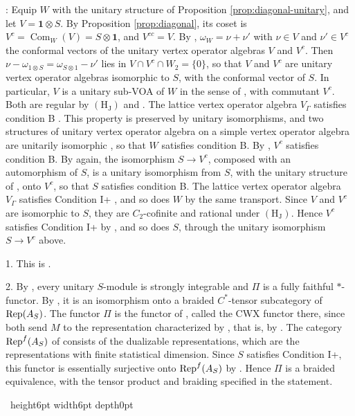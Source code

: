 \documentclass[leqno]{article}
\let\cal\relax
\newcommand{\cal}{\mathcal}
\newcommand{\qed}{\hfill \vrule height6pt  width6pt depth0pt}
\newcommand{\ot}{\otimes}
\DeclareMathOperator{\Rep}{Rep} %
\newenvironment{proof}[1][]{\noindent {\it Proof #1} : }{\hbox{~}\qed
\smallskip
}
\numberwithin{equation}{section}
\begin{document}
\begin{proof}
Equip $W$ with the unitary structure of Proposition \ref{prop:diagonal-unitary}, and let $V = \mathbf 1 \ot S$. By Proposition \ref{prop:diagonal}, its coset is $V^c = \operatorname{Com}_W(V) = S \ot \mathbf 1$, and $V^{cc} = V$. By \cite[Propositions 5.29 and 5.31 p.~45]{CKLW18}, $\omega_W = \nu+\nu'$ with $\nu \in V$ and $\nu' \in V^c$ the conformal vectors of the unitary vertex operator algebras $V$ and $V^c$. Then $\nu-\omega_{1 \ot S} = \omega_{S \ot 1}-\nu'$ lies in $V \cap V^c \cap W_2 = \{0\}$, so that $V$ and $V^c$ are unitary vertex operator algebras isomorphic to $S$, with the conformal vector of $S$. In particular, $V$ is a unitary sub-VOA of $W$ in the sense of \cite[Section 3.6.1 p.~49]{Gui26}, with commutant $V^c$. Both are regular by $\mathrm{(H_J)}$ and \cite[Theorem 4.5]{ABD04}. The lattice vertex operator algebra $V_\Gamma$ satisfies condition B \cite[Theorem 3.46 p.~57]{Gui26}. This property is preserved by unitary isomorphisms, and two structures of unitary vertex operator algebra on a simple vertex operator algebra are unitarily isomorphic \cite[Proposition 5.19 p.~40 and p.~41]{CKLW18}, so that $W$ satisfies condition B. By \cite[Theorem 3.34 p.~51]{Gui26}, $V^c$ satisfies condition B. By \cite[Proposition 5.19 p.~40 and p.~41]{CKLW18} again, the isomorphism $S \to V^c$, composed with an automorphism of $S$, is a unitary isomorphism from $S$, with the unitary structure of \cite[Theorem 10.10]{Arh26}, onto $V^c$, so that $S$ satisfies condition B. The lattice vertex operator algebra $V_\Gamma$ satisfies Condition I+ \cite[Example 6.19(b) p.~71]{Gui25}, and so does $W$ by the same transport. Since $V$ and $V^c$ are isomorphic to $S$, they are $C_2$-cofinite and rational under $\mathrm{(H_J)}$. Hence $V^c$ satisfies Condition I+ by \cite[Theorem 6.18, part 3, p.~70]{Gui25}, and so does $S$, through the unitary isomorphism $S \to V^c$ above.

1. This is \cite[Theorem 3.15 p.~45]{Gui26}.

2. By \cite[Theorems 3.16 and 3.17 p.~45]{Gui26}, every unitary $S$-module is strongly integrable and $\Pi$ is a fully faithful $*$-functor. By \cite[Corollary 3.23 p.~48]{Gui26}, it is an isomorphism onto a braided $C^*$-tensor subcategory of $\Rep(\cal A_S)$. The functor $\Pi$ is the functor of \cite[Definition 4.22 and Theorem 4.24 p.~43]{Gui25}, called the CWX functor there, since both send $M$ to the representation characterized by \cite[(3.8) p.~41]{Gui26}, that is, by \cite[(4.6) p.~43]{Gui25}. The category $\Rep^f(\cal A_S)$ of \cite[p.~68]{Gui25} consists of the dualizable representations, which are the representations with finite statistical dimension. Since $S$ satisfies Condition I+, this functor is essentially surjective onto $\Rep^f(\cal A_S)$ by \cite[Theorem 6.14 p.~69 and Definition 6.17 p.~70]{Gui25}. Hence $\Pi$ is a braided equivalence, with the tensor product and braiding specified in the statement.


\end{proof}
\end{document}
